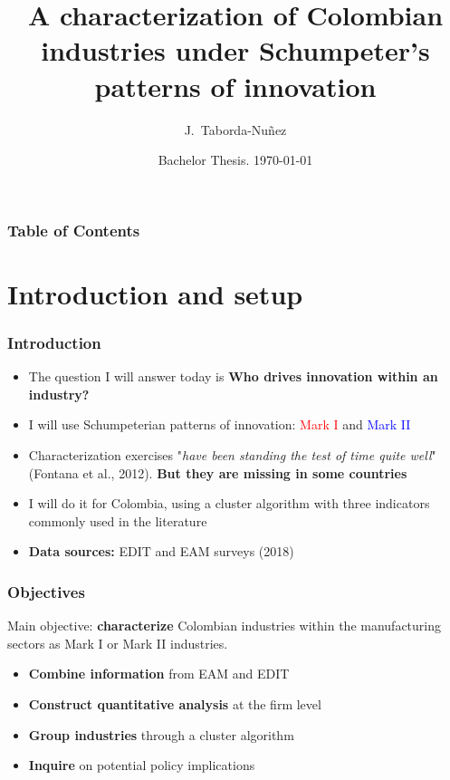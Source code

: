 \documentclass{beamer}
\begin{document}
	\title[J.S Industry Characterization]{
	\textbf{A characterization of Colombian industries under Schumpeter's patterns of innovation}
	}   
	\date[BA 2022-30]{Bachelor Thesis. \today} 
	\author[Taborda-Nuñez]{J.~Taborda-Nuñez}
	\begin{frame} 
		\titlepage 
	\end{frame}  

	\begin{frame}
		\frametitle{Table of Contents}
		\tableofcontents
	\end{frame}


	\AtBeginSection[]
	{
		\begin{frame}
			\frametitle{Table of Contents}
			\tableofcontents[currentsection]
		\end{frame}
	}
	
\section{Introduction and setup}
	\begin{frame}[allowframebreaks]
		\frametitle{Introduction} 
		\begin{itemize}
			\item The question I will answer today is \textbf{Who drives innovation within an industry?}
			\item I will use Schumpeterian patterns of innovation: \textcolor{red}{Mark I} and \textcolor{blue}{Mark II}
			\item Characterization exercises "\textit{have been standing the test of time quite well}" (Fontana et al., 2012). \textbf{But they are missing in some countries}
			\item I will do it for Colombia, using a cluster algorithm with three indicators commonly used in the literature
			\item \textbf{Data sources:} EDIT and EAM surveys (2018)
		\end{itemize}
	\end{frame}	
	\begin{frame}
		\frametitle{Objectives}
		Main objective: \textbf{characterize} Colombian industries within the manufacturing sectors as Mark I or Mark II industries.
		\begin{itemize}
			\item \textbf{Combine information} from EAM and EDIT
			\item \textbf{Construct quantitative analysis} at the firm level
			\item \textbf{Group industries} through a cluster algorithm
			\item \textbf{Inquire} on potential policy implications
		\end{itemize}
	\end{frame}
\end{document}
